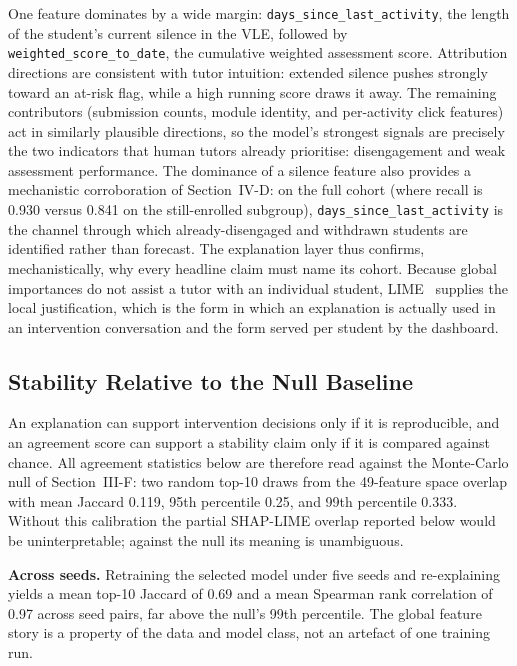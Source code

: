 \documentclass[conference]{IEEEtran}
\begin{document}
One feature dominates by a wide margin: \texttt{days\_since\_last\_activity},
the length of the student's current silence in the VLE, followed by
\texttt{weighted\_score\_to\_date}, the cumulative weighted assessment score.
Attribution directions are consistent with tutor intuition: extended silence
pushes strongly toward an at-risk flag, while a high running score draws it
away. The remaining contributors (submission counts, module identity, and
per-activity click features) act in similarly plausible directions, so the
model's strongest signals are precisely the two indicators that human tutors
already prioritise: disengagement and weak assessment performance. The
dominance of a silence feature also provides a mechanistic corroboration of
Section~IV-D: on the full cohort (where recall is 0.930
versus 0.841 on the still-enrolled subgroup),
\texttt{days\_since\_last\_activity} is the channel through which
already-disengaged and withdrawn students are identified rather than
forecast. The explanation layer thus confirms, mechanistically, why every
headline claim must name its cohort. Because global importances do not
assist a tutor with an individual student, LIME~\cite{ribeiro2016} supplies
the local justification, which is the form in which an explanation is
actually used in an intervention conversation and the form served per
student by the dashboard.

\subsection{Stability Relative to the Null Baseline}

An explanation can support intervention decisions only if it is
reproducible, and an agreement score can support a stability claim only if
it is compared against chance. All agreement statistics below are therefore
read against the Monte-Carlo null of Section~III-F: two random top-10
draws from the 49-feature space overlap with mean Jaccard 0.119,
95th percentile 0.25, and 99th percentile 0.333. Without
this calibration the partial SHAP-LIME overlap reported below would be
uninterpretable; against the null its meaning is unambiguous.

\textbf{Across seeds.}
Retraining the selected model under five seeds and re-explaining yields a
mean top-10 Jaccard of 0.69 and a mean Spearman rank
correlation of 0.97 across seed pairs, far above the null's
99th percentile. The global feature story is a property of the data and
model class, not an artefact of one training run.
\end{document}
